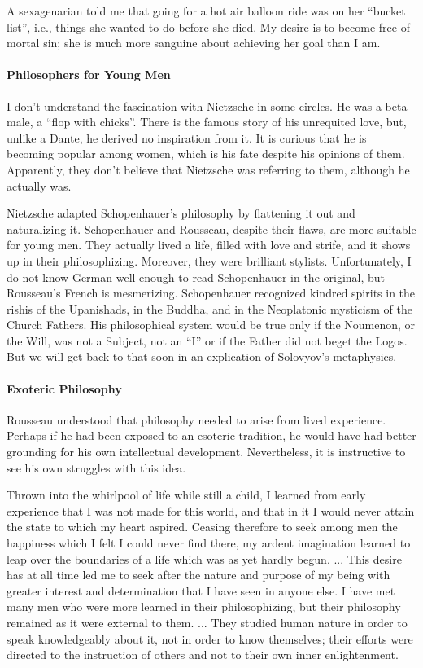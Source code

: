 A sexagenarian told me that going for a hot air balloon ride was on her ``bucket list'', i.e., things she wanted to do before she died. My desire is to become free of mortal sin; she is much more sanguine about achieving her goal than I am.

\paragraph{Philosophers for Young Men}


I don't understand the fascination with Nietzsche in some circles. He was a beta male, a ``flop with chicks''. There is the famous story of his unrequited love, but, unlike a Dante, he derived no inspiration from it. It is curious that he is becoming popular among women, which is his fate despite his opinions of them. Apparently, they don't believe that Nietzsche was referring to them, although he actually was.

Nietzsche adapted Schopenhauer's philosophy by flattening it out and naturalizing it. Schopenhauer and Rousseau, despite their flaws, are more suitable for young men. They actually lived a life, filled with love and strife, and it shows up in their philosophizing. Moreover, they were brilliant stylists. Unfortunately, I do not know German well enough to read Schopenhauer in the original, but Rousseau's French is mesmerizing. Schopenhauer recognized kindred spirits in the rishis of the Upanishads, in the Buddha, and in the Neoplatonic mysticism of the Church Fathers. His philosophical system would be true only if the Noumenon, or the Will, was not a Subject, not an ``I'' or if the Father did not beget the Logos. But we will get back to that soon in an explication of Solovyov's metaphysics.

\paragraph{Exoteric Philosophy}


Rousseau understood that philosophy needed to arise from lived experience. Perhaps if he had been exposed to an esoteric tradition, he would have had better grounding for his own intellectual development. Nevertheless, it is instructive to see his own struggles with this idea.

\begin{quotex}
Thrown into the whirlpool of life while still a child, I learned from early experience that I was not made for this world, and that in it I would never attain the state to which my heart aspired. Ceasing therefore to seek among men the happiness which I felt I could never find there, my ardent imagination learned to leap over the boundaries of a life which was as yet hardly begun. ... This desire has at all time led me to seek after the nature and purpose of my being with greater interest and determination that I have seen in anyone else. I have met many men who were more learned in their philosophizing, but their philosophy remained as it were external to them. ... They studied human nature in order to speak knowledgeably about it, not in order to know themselves; their efforts were directed to the instruction of others and not to their own inner enlightenment.
\end{quotex}


